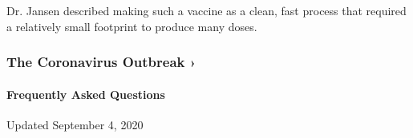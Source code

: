 Dr. Jansen described making such a vaccine as a clean, fast process that
required a relatively small footprint to produce many doses.

\href{https://www.nytimes3xbfgragh.onion/news-event/coronavirus?action=click\&pgtype=Article\&state=default\&region=MAIN_CONTENT_3\&context=storylines_faq}{}

\hypertarget{the-coronavirus-outbreak-}{%
\subsubsection{The Coronavirus Outbreak
›}\label{the-coronavirus-outbreak-}}

\hypertarget{frequently-asked-questions}{%
\paragraph{Frequently Asked
Questions}\label{frequently-asked-questions}}

Updated September 4, 2020

